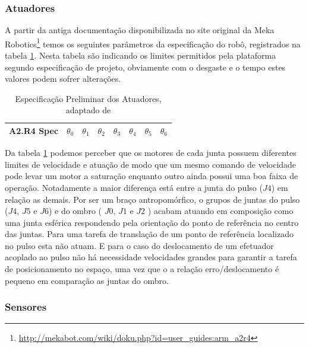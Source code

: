 \subsubsection{Atuadores}

A partir da antiga documentação disponibilizada no site original da Meka Robotics\footnote{\url{http://mekabot.com/wiki/doku.php?id=user_guides:arm_a2r4}} temos os seguintes parâmetros da especificação do robô, registrados na tabela \ref{tab:a2armActuationDoc}. Nesta tabela são indicando os limites permitidos pela plataforma segundo especificação de projeto, obviamente com o desgaste e o tempo estes valores podem sofrer alterações.

\begin{table}[H]
    \centering
    \begin{tabular}{c|ccccccc}
         \hline
         A2.R4 Spec & $\theta_0$ & $\theta_1$ & $\theta_2$ & $\theta_3$ & $\theta_4$ & $\theta_5$ & $\theta_6$\\
         \hline
         
         \hline
    \end{tabular}
    \caption{Especificação Preliminar dos Atuadores, adaptado de \cite{nobody}}
    \label{tab:a2armActuationDoc}
\end{table}

Da tabela \ref{tab:a2armActuationDoc} podemos perceber que os motores de cada junta possuem diferentes limites de velocidade e atuação de modo que um mesmo comando de velocidade pode levar um motor a saturação enquanto outro ainda possui uma boa faixa de operação. Notadamente a maior diferença está entre a junta do pulso ($J4$) em relação as demais. Por ser um braço antropomórfico, o grupos de juntas do pulso ($J4$, $J5$ e $J6$) e do ombro ( $J0$, $J1$ e $J2$ ) acabam atuando em composição como uma junta esférica respondendo pela orientação do ponto de referência no centro das juntas. Para uma tarefa de translação de um ponto de referência localizado no pulso esta não atuam. E para o caso do deslocamento de um efetuador acoplado ao pulso não há necessidade velocidades grandes para garantir a tarefa de posicionamento no espaço, uma vez que o a relação erro/deslocamento é pequeno em comparação as juntas do ombro.


\subsubsection{Sensores}


